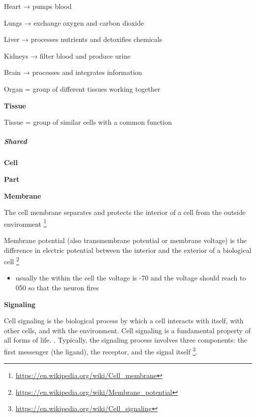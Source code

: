 \documentclass{book}
\providecommand{\ProjectDeepHeading}[2]{%
    \par\medskip\noindent\textbf{#2}\par\smallskip
}
\providecommand{\seeherefooter}[1]{\footnote{\url{#1}}}
\begin{document}
    Heart → pumps blood

    Lungs → exchange oxygen and carbon dioxide
    
    Liver → processes nutrients and detoxifies chemicals
    
    Kidneys → filter blood and produce urine
    
    Brain → processes and integrates information
    
    Organ = group of different tissues working together

\ProjectDeepHeading{1}{Tissue}


Tissue = group of similar cells with a common function

\subparagraph{Shared}

\ProjectDeepHeading{1}{Cell}

\ProjectDeepHeading{2}{Part}

\ProjectDeepHeading{3}{Membrane}


The cell membrane separates and protects the interior of a cell from the outside environment
    \seeherefooter{https://en.wikipedia.org/wiki/Cell_membrane}


Membrane potential (also transmembrane potential or membrane voltage) is the difference in electric potential between the interior and the exterior of a biological cell \seeherefooter{https://en.wikipedia.org/wiki/Membrane_potential}
    
    \begin{itemize}
        \item usually the within the cell the voltage is -70 and the voltage should reach to 050 so that the neuron fires
    \end{itemize}

\ProjectDeepHeading{3}{Signaling}


Cell signaling is the biological process by which a cell interacts with itself, with other cells, and with the environment. Cell signaling is a fundamental property of all forms of life. . Typically, the signaling process involves three components: the first messenger (the ligand), the receptor, and the signal itself \seeherefooter{https://en.wikipedia.org/wiki/Cell_signaling}.
    
\end{document}
